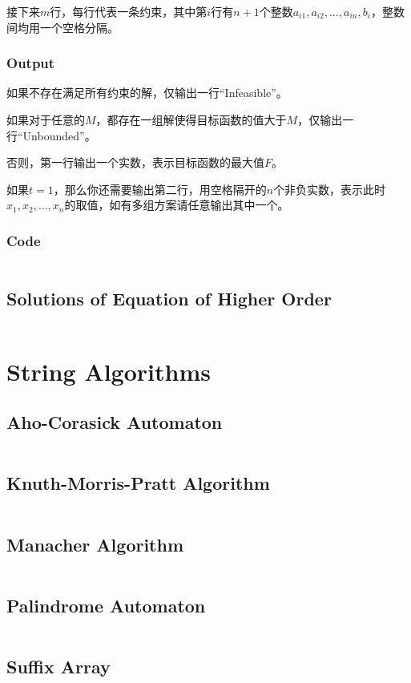 \documentclass[a4paper,openany]{book}
\newcommand{\cppcode}[1]
{
  \inputminted[mathescape,
  tabsize=4,
  linenos,
  framesep=2mm,
  breakaftergroup=true,
  breakautoindent=true,
  breakbytoken=true,
  breaklines=true,
  fontsize=\small
  ]{cpp}{Source/#1}
}
\begin{document}
接下来$m$行，每行代表一条约束，其中第$i$行有$n+1$个整数$a_{i1},a_{i2},\ldots,a_{in},b_i$，整数间均用一个空格分隔。
\subsection{Output}
如果不存在满足所有约束的解，仅输出一行``Infeasible''。

如果对于任意的$M$，都存在一组解使得目标函数的值大于$M$，仅输出一行``Unbounded''。

否则，第一行输出一个实数，表示目标函数的最大值$F$。

如果$t=1$，那么你还需要输出第二行，用空格隔开的$n$个非负实数，表示此时$x_1,x_2,\ldots,x_n$的取值，如有多组方案请任意输出其中一个。
\subsection{Code}
\cppcode{/Numerical Algorithms/Simplex.cpp}
\section{Solutions of Equation of Higher Order}
\cppcode{/Numerical Algorithms/Solutions of Equation of Higher Order.cpp}

\chapter{String Algorithms}
\section{Aho-Corasick Automaton}
\cppcode{/String Algorithms/Aho-Corasick Automaton.cpp}
\section{Knuth-Morris-Pratt Algorithm}
\cppcode{/String Algorithms/Knuth-Morris-Pratt Algorithm.cpp}
\section{Manacher Algorithm}
\cppcode{/String Algorithms/Manacher Algorithm.cpp}
\section{Palindrome Automaton}
\cppcode{/String Algorithms/Palindrome Automaton.cpp}
\section{Suffix Array}
\cppcode{/String Algorithms/Suffix Array.cpp}
\end{document}

